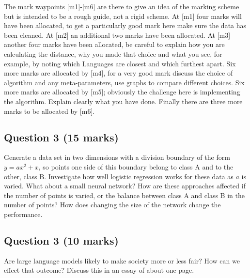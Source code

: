 \documentclass[12pt]{article}
\begin{document}
The mark waypoints [m1]-[m6] are there to give an idea of the marking
scheme but is intended to be a rough guide, not a rigid scheme. At
[m1] four marks will have been allocated, to get a particularly good
mark here make sure the data has been cleaned. At [m2] an additional
two marks have been allocated. At [m3] another four marks have been
allocated, be careful to explain how you are calculating the distance,
why you made that choice and what you see, for example, by noting
which Languages are closest and which furthest apart. Six more marks are
allocated by [m4], for a very good mark discuss the choice of
algorithm and any meta-parameters, use graphs to compare different
choices. Six more marks are allocated by [m5]; obviously the challenge
here is implementing the algorithm. Explain clearly what you have
done. Finally there are three more marks to be allocated by [m6].

\subsection*{Question 3 (15 marks)}

Generate a data set in two dimensions with a division boundary of the
form $y=ax^2+x$, so points one side of this boundary belong to class A
and to the other, class B. Investigate how well logistic regression
works for these data as $a$ is varied. What about a small neural
network? How are these approaches affected if the number of points is
varied, or the balance between class A and class B in the number of
points? How does changing the size of the network change the performance.


\subsection*{Question 3 (10 marks)}

Are large language models likely to make society more or less fair?
How can we effect that outcome? Discuss this in an essay of about one
page.
\end{document}
